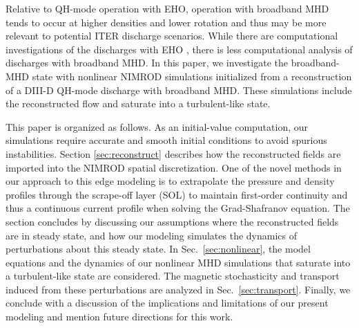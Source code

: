 Relative to QH-mode operation with EHO, operation with broadband MHD tends to
occur at higher densities and lower rotation and thus may be more relevant to
potential ITER discharge scenarios.  While there are computational
investigations of the discharges with EHO \cite{liu15,battaglia14}, there is
less computational analysis of discharges with broadband MHD. In this paper, we
investigate the broadband-MHD state with nonlinear NIMROD
\cite{Sovinec04,Sovinec10} simulations initialized from a reconstruction of a
DIII-D QH-mode discharge with broadband MHD. These simulations include the
reconstructed flow and saturate into a turbulent-like state.

This paper is organized as follows.  As an initial-value computation, our
simulations require accurate and smooth initial conditions to avoid 
spurious instabilities. 
Section \ref{sec:reconstruct} describes how the reconstructed
fields are imported into the NIMROD spatial discretization. One of the novel
methods in our approach to this edge modeling is to extrapolate the pressure
and density profiles through the scrape-off layer (SOL) to maintain first-order
continuity and thus a continuous current profile when solving the
Grad-Shafranov equation.  The section concludes by discussing our assumptions
where the reconstructed fields are in steady state, and how our modeling
simulates the dynamics of perturbations about this steady state. In
Sec.~\ref{sec:nonlinear}, the model equations and the dynamics of our nonlinear
MHD simulations that saturate into a turbulent-like state are considered. The
magnetic stochasticity and transport induced from these perturbations are
analyzed in Sec.~\ref{sec:transport}.  Finally, we conclude with a discussion
of the implications and limitations of our present modeling and mention future
directions for this work.
 
